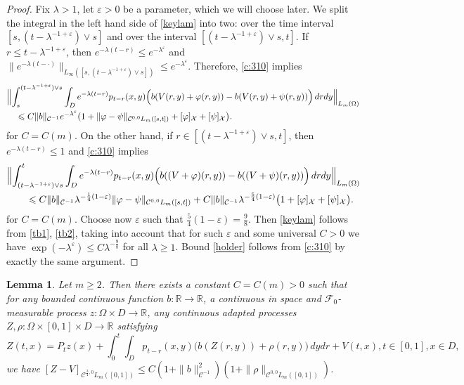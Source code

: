 \documentclass[12pt]{article}
\newtheorem{lemma}[theorem]{Lemma}
\theoremstyle{definition}
\DeclareMathOperator{\1}{\mathbbm{1}}%
\def\eps{\varepsilon}
\def\phi{\varphi}
\renewcommand{\ge}{\geqslant}
\renewcommand{\le}{\leqslant}
\newcommand{\nn}{\nonumber}
\newcommand{\C}{\mathcal{C}}
\newcommand{\F}{\mathcal{F}}
\newcommand{\R}{\mathbb{R}}
\newcommand{\X}{\mathcal{X}}
\begin{document}
\begin{proof}
Fix $\lambda>1$, let $\eps>0$ be a parameter, which we will choose later. We split the integral in the left hand side of \eqref{keylam} into two: over the time interval $[s,(t-\lambda^{-1+\eps})\vee s]$ and over the interval $[(t-\lambda^{-1+\eps})\vee s, t]$. If $r\le t-\lambda^{-1+\eps}$, then $e^{-\lambda(t-r)}\le e^{-\lambda^\eps}$ and $\|e^{-\lambda (t-\cdot)}\|_{L_\infty([s,(t-\lambda^{-1+\eps})\vee s])}\le e^{-\lambda^\eps}$. Therefore, \cref{c:310} implies 
\begin{align}\label{tb1}
&\Bigl\|\int_s^{(t-\lambda^{-1+\eps})\vee s}\int_ D e^{-\lambda(t-r)}p_{t-r}(x,y)\Bigl(b( V(r,y)+\phi(r,y))- b( V(r,y)+\psi(r,y))\Bigr)\,dr dy\Bigr\|_{L_m(\Omega)}\nn\\
&\quad\le 
C \|b\|_{\C^{-1}} e^{-\lambda^\eps}(1+\|\phi-\psi\|_{\C^{0,0}L_m([s,t])} +[\phi]_{\X}+[\psi]_{\X}\bigr). 
\end{align}
for $C=C(m)$. 
On the other hand, if $r\in [(t-\lambda^{-1+\eps})\vee s, t]$, then $e^{-\lambda(t-r)}\le 1$ and \cref{c:310} implies 
\begin{align}\label{tb2}
&\Bigl\|\int_{(t-\lambda^{-1+\eps})\vee s}^t\int_ D e^{-\lambda(t-r)}p_{t-r}(x,y)\Bigl(b( (V+\phi)(r,y))- b( (V+\psi)(r,y))\Bigr)\,dr dy\Bigr\|_{L_m(\Omega)}\nn\\
&\qquad\le C \|b\|_{\C^{-1}}                                                                                                                                                                     \lambda^{-\frac14(1-\eps)}\|\phi-\psi\|_{\C^{0,0}L_m([s,t])}+C \|b\|_{\C^{-1}} \lambda^{-\frac54(1-\eps)}\bigl(1+[\phi]_{\X}+[\psi]_{\X}\bigr). 
\end{align}
for $C=C(m)$. Choose now $\eps$ such that $\frac54(1-\eps)=\frac{9}8$. Then \eqref{keylam} follows from \eqref{tb1}, \eqref{tb2}, taking into account that for such $\eps$ and some universal $C>0$ we   have $\exp(-\lambda^\eps)\le C \lambda^{-\frac{9}8}$ for all $\lambda\ge1$. 
Bound \eqref{holder} follows from \cref{c:310}  by exactly the same argument. 
\end{proof}	





\begin{lemma}\label{l:apriori}
Let $m\ge2$.  Then there exists a constant $C=C(m)>0$ such that for
any bounded continuous function $b\colon\R\to\R$, a continuous in
space and  $\F_0$-measurable process $z\colon\Omega\times D\to\R$, any  continuous adapted processes $Z,\rho\colon\Omega\times[0,1]\times D\to\R$ satisfying 
\begin{equation*}%
Z(t,x)=P_t z(x)+ \int_0^t \int_{D} p_{t-r}(x,y)\bigl(b(Z(r,y))+ \rho(r,y)\bigr)\,dydr + V(t,x), t\in[0,1], x\in D, 
\end{equation*}
we have 
$[Z-V]_{\C^{\frac34,0}L_m([0,1])}\le  C (1+\|b\|_{\C^{-1}}^2)(1+\|\rho\|_{ \C^{0,0}L_m([0,1])})$. 
\end{lemma}	
\end{document}
